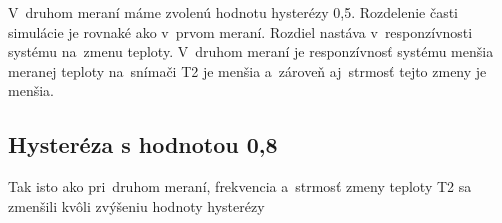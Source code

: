 \documentclass{article}
\begin{document}

\clearpage


V~druhom meraní máme zvolenú hodnotu hysterézy 0,5. Rozdelenie časti simulácie je rovnaké ako v~prvom meraní.
Rozdiel nastáva v~responzívnosti systému na~zmenu teploty. V~druhom meraní je responzívnosť systému menšia
meranej teploty na~snímači T2 je menšia a~zároveň aj~strmosť tejto zmeny je menšia.

\subsection{Hysteréza s hodnotou 0,8}
\label{sec:meranie3}


\clearpage


Tak isto ako pri~druhom meraní, frekvencia a~strmosť zmeny teploty T2 sa zmenšili kvôli zvýšeniu hodnoty hysterézy
\end{document}
